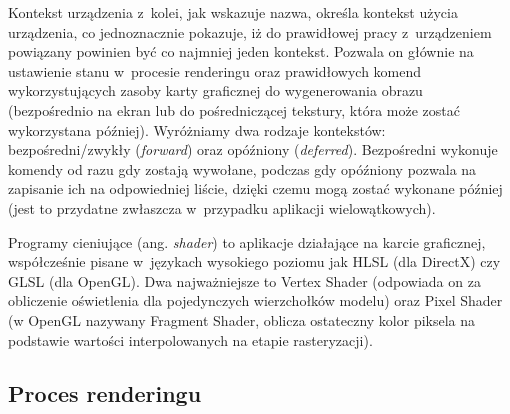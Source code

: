 Kontekst urządzenia z~kolei, jak wskazuje nazwa, określa kontekst użycia urządzenia, co jednoznacznie pokazuje, iż do prawidłowej pracy z~urządzeniem powiązany powinien być co najmniej jeden kontekst. Pozwala on głównie na ustawienie stanu w~procesie renderingu oraz prawidłowych komend wykorzystujących zasoby karty graficznej do wygenerowania obrazu (bezpośrednio na ekran lub do pośredniczącej tekstury, która może zostać wykorzystana później). Wyróżniamy dwa rodzaje kontekstów: bezpośredni/zwykły (\emph{forward}) oraz opóźniony (\emph{deferred}). Bezpośredni wykonuje komendy od razu gdy zostają wywołane, podczas gdy opóźniony pozwala na zapisanie ich na odpowiedniej liście, dzięki czemu mogą zostać wykonane później (jest to przydatne zwłaszcza w~przypadku aplikacji wielowątkowych).

Programy cieniujące (ang. \emph{shader}) to aplikacje działające na karcie graficznej, współcześnie pisane w~językach wysokiego poziomu jak HLSL (dla DirectX) czy GLSL (dla OpenGL). Dwa najważniejsze to Vertex Shader (odpowiada on za obliczenie oświetlenia dla pojedynczych wierzchołków modelu) oraz Pixel Shader (w OpenGL nazywany Fragment Shader, oblicza ostateczny kolor piksela na podstawie wartości interpolowanych na etapie rasteryzacji).

\subsection{Proces renderingu}

